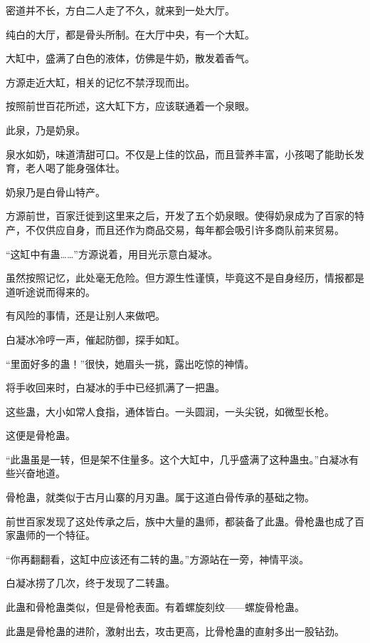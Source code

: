 
\begin{this_body}

密道并不长，方白二人走了不久，就来到一处大厅。

纯白的大厅，都是骨头所制。在大厅中央，有一个大缸。

大缸中，盛满了白色的液体，仿佛是牛奶，散发着香气。

方源走近大缸，相关的记忆不禁浮现而出。

按照前世百花所述，这大缸下方，应该联通着一个泉眼。

此泉，乃是奶泉。

泉水如奶，味道清甜可口。不仅是上佳的饮品，而且营养丰富，小孩喝了能助长发育，老人喝了能身强体壮。

奶泉乃是白骨山特产。

方源前世，百家迁徙到这里来之后，开发了五个奶泉眼。使得奶泉成为了百家的特产，不仅供应自身，而且还作为商品交易，每年都会吸引许多商队前来贸易。

“这缸中有蛊……”方源说着，用目光示意白凝冰。

虽然按照记忆，此处毫无危险。但方源生性谨慎，毕竟这不是自身经历，情报都是道听途说而得来的。

有风险的事情，还是让别人来做吧。

白凝冰冷哼一声，催起防御，探手如缸。

“里面好多的蛊！”很快，她眉头一挑，露出吃惊的神情。

将手收回来时，白凝冰的手中已经抓满了一把蛊。

这些蛊，大小如常人食指，通体皆白。一头圆润，一头尖锐，如微型长枪。

这便是骨枪蛊。

“此蛊虽是一转，但是架不住量多。这个大缸中，几乎盛满了这种蛊虫。”白凝冰有些兴奋地道。

骨枪蛊，就类似于古月山寨的月刃蛊。属于这道白骨传承的基础之物。

前世百家发现了这处传承之后，族中大量的蛊师，都装备了此蛊。骨枪蛊也成了百家蛊师的一个特征。

“你再翻翻看，这缸中应该还有二转的蛊。”方源站在一旁，神情平淡。

白凝冰捞了几次，终于发现了二转蛊。

此蛊和骨枪蛊类似，但是骨枪表面。有着螺旋刻纹——螺旋骨枪蛊。

此蛊是骨枪蛊的进阶，激射出去，攻击更高，比骨枪蛊的直射多出一股钻劲。


\end{this_body}
